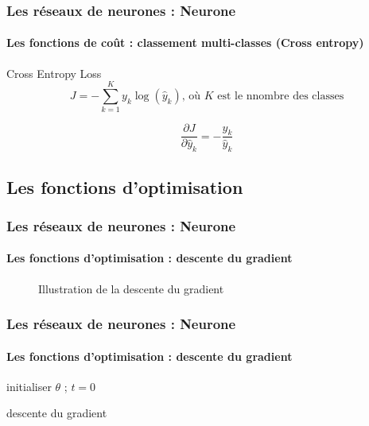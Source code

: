 \documentclass[xcolor=table]{beamer}
\begin{document}
\begin{frame}
\frametitle{Les réseaux de neurones : Neurone}
\framesubtitle{Les fonctions de coût : classement multi-classes (Cross entropy)}

\begin{block}{Cross Entropy Loss}
	\[J = - \sum\limits_{k=1}^{K} y_{k} \log(\hat{y}_{k}) \text{, où } K \text{ est le nnombre des classes} \]
	
	\[
	\frac{\partial J}{\partial \hat{y}_k} = - \frac{y_{k}}{\hat{y}_{k}}
	\]
\end{block}


\end{frame}

\subsection{Les fonctions d'optimisation}

\begin{frame}
\frametitle{Les réseaux de neurones : Neurone}
\framesubtitle{Les fonctions d'optimisation : descente du gradient}

\begin{figure}
	\caption{Illustration de la descente du gradient \cite{2020-calin}}
\end{figure}

\end{frame}

\begin{frame}
\frametitle{Les réseaux de neurones : Neurone}
\framesubtitle{Les fonctions d'optimisation : descente du gradient}

\begin{algorithm}[H]
	\KwResult{$ \theta $}
	initialiser $ \theta $ ; $ t = 0 $\;
	\caption{descente du gradient}
\end{algorithm}

\end{frame}
\end{document}
